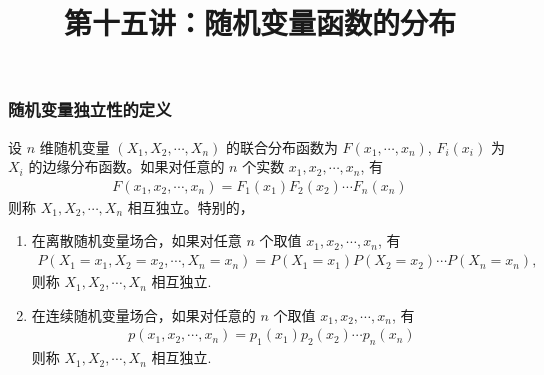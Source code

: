 \begin{frame}
	\frametitle{随机变量独立性的定义}
	\begin{defi}
	 设 $n$ 维随机变量 $(X_1,X_2,\cdots,X_n)$ 的联合分布函数为 $F (x_1,
		\cdots,x_n)$, $F_i (x_i)$ 为 $X_i$ 的边缘分布函数。如果对任意的 $n$ 个实数 $x_1,x_2,\cdots, x_n$, 有
		\begin{eqnarray*}
			F(x_1,x_2,\cdots, x_n)=F_1(x_1)F_2(x_2)\cdots F_n(x_n)
		\end{eqnarray*}
		则称 $X_1,X_2,\cdots, X_n$ 相互独立。特别的，
	\end{defi}
	\pause
	\begin{enumerate}[<+-|alert@+>]
		\item 在离散随机变量场合，如果对任意 $n$ 个取值 $x_1,x_2,\cdots, x_n$, 有
		{\small     \begin{eqnarray*}
				P(X_1=x_1,X_2=x_2,\cdots,X_n=x_n)=P(X_1=x_1)P(X_2=x_2)\cdots P(X_n=x_n),
		\end{eqnarray*}}
		则称 $X_1,X_2,\cdots, X_n$ 相互独立.


		\item 在连续随机变量场合，如果对任意的 $n$ 个取值 $x_1,x_2,\cdots, x_n$, 有
		\begin{eqnarray*}
			p(x_1,x_2,\cdots, x_n)=p_1(x_1)p_2(x_2)\cdots p_n(x_n)
		\end{eqnarray*}
		则称 $X_1,X_2,\cdots, X_n$ 相互独立.
	\end{enumerate}
\end{frame}



 \title[概率论]{第十五讲：随机变量函数的分布}
 \date{}



 	{ 
 		\begin{frame}
 			\titlepage
 		\end{frame}
 	}














